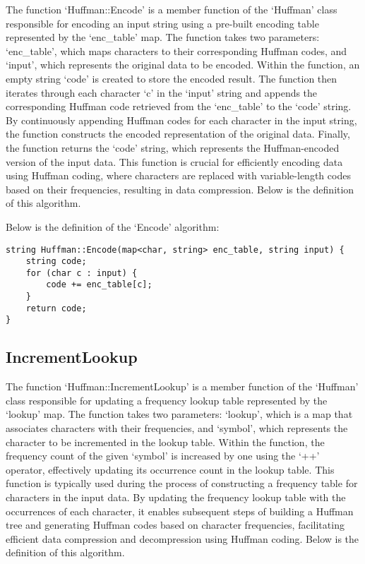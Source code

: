 The function `Huffman::Encode' is a member function of the `Huffman' class responsible for encoding an input string using a pre-built encoding table represented by the `enc\_table' map. The function 
takes two parameters: `enc\_table', which maps characters to their corresponding Huffman codes, and `input', which represents the original data to be encoded. Within the function, an empty string `code' 
is created to store the encoded result. The function then iterates through each character `c' in the `input' string and appends the corresponding Huffman code retrieved from the `enc\_table' to the `code' 
string. By continuously appending Huffman codes for each character in the input string, the function constructs the encoded representation of the original data. Finally, the function returns the `code' 
string, which represents the Huffman-encoded version of the input data. This function is crucial for efficiently encoding data using Huffman coding, where characters are replaced with variable-length 
codes based on their frequencies, resulting in data compression. Below is the definition of this algorithm.

\begin{highlight}
    
Below is the definition of the `Encode' algorithm:

\horizontalline

\begin{verbatim}
string Huffman::Encode(map<char, string> enc_table, string input) {
    string code;
    for (char c : input) {
        code += enc_table[c];
    }
    return code;
}
\end{verbatim}

\end{highlight}

\subsection*{IncrementLookup}

The function `Huffman::IncrementLookup' is a member function of the `Huffman' class responsible for updating a frequency lookup table represented by the `lookup' map. The function takes two parameters: 
`lookup', which is a map that associates characters with their frequencies, and `symbol', which represents the character to be incremented in the lookup table. Within the function, the frequency count of 
the given `symbol' is increased by one using the `++' operator, effectively updating its occurrence count in the lookup table. This function is typically used during the process of constructing a frequency 
table for characters in the input data. By updating the frequency lookup table with the occurrences of each character, it enables subsequent steps of building a Huffman tree and generating Huffman codes 
based on character frequencies, facilitating efficient data compression and decompression using Huffman coding. Below is the definition of this algorithm.

